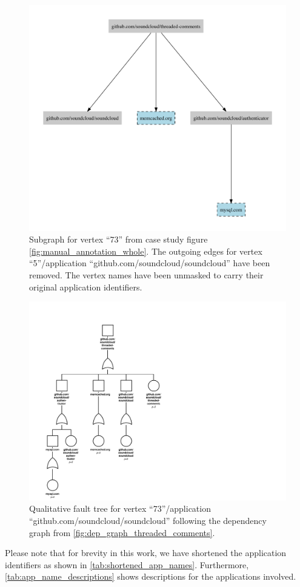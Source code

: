 \begin{figure}[h!]
  \centering
  \includegraphics[width=0.6\linewidth] {images/dependencies-threaded-comments.pdf}
  \caption{Subgraph for vertex ``73'' from case study figure \autoref{fig:manual_annotation_whole}. The outgoing edges for vertex ``5''/application ``github.com/soundcloud/soundcloud'' have been removed. The vertex names have been unmasked to carry their original application identifiers.}
  \label{fig:dep_graph_threaded_comments}
\end{figure}

\begin{figure}[h!]
  \centering
  \includegraphics[width=0.6\linewidth] {images/threaded-comments-fault-tree-cropped.pdf}
  \caption{Qualitative fault tree for vertex ``73''/application ``github.com/soundcloud/soundcloud'' following the dependency graph from \autoref{fig:dep_graph_threaded_comments}.}
  \label{fig:fault_tree_threaded_comments}
\end{figure}

Please note that for brevity in this work, we have shortened the application identifiers as shown in \autoref{tab:shortened_app_names}. Furthermore, \autoref{tab:app_name_descriptions} shows descriptions for the applications involved.

